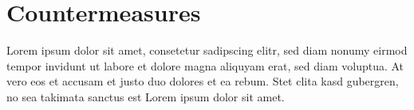 \chapter{Countermeasures}\label{sec:countermeasure}

Lorem ipsum dolor sit amet, consetetur sadipscing elitr, sed diam nonumy eirmod
tempor invidunt ut labore et dolore magna aliquyam erat, sed diam voluptua. At
vero eos et accusam et justo duo dolores et ea rebum. Stet clita kasd gubergren,
no sea takimata sanctus est Lorem ipsum dolor sit amet.
